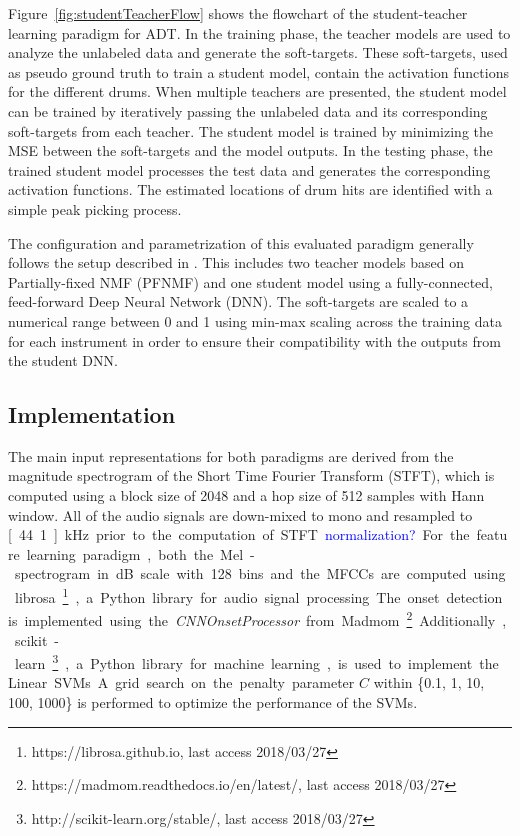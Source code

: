 \documentclass{article}
\newcommand{\comment}[1]{{\textcolor{blue}{#1}}}
\begin{document}
Figure~\ref{fig:studentTeacherFlow} shows the flowchart of the student-teacher learning paradigm for ADT. In the training phase, the teacher models are used to analyze the unlabeled data and generate the soft-targets. These soft-targets, used as pseudo ground truth to train a student model, contain the activation functions for the different drums. 
When multiple teachers are presented, the student model can be trained by iteratively passing the unlabeled data and its corresponding soft-targets from each teacher. The student model is trained by minimizing the MSE between the soft-targets and the model outputs. 
In the testing phase, the trained student model processes the test data and generates the corresponding activation functions. The estimated locations of drum hits are identified with a simple peak picking process. 

The configuration and parametrization of this evaluated paradigm generally follows the setup described in \cite{Wu2017}. This includes two teacher models based on Partially-fixed NMF (PFNMF) \cite{Wu2015_ismir} and one student model using a fully-connected, feed-forward Deep Neural Network (DNN). The soft-targets are scaled to a numerical range between 0 and 1 using min-max scaling across the training data for each instrument in order to ensure their compatibility with the outputs from the student DNN. 
\subsection{Implementation}
The main input representations for both paradigms are derived from the magnitude spectrogram of the Short Time Fourier Transform (STFT), which is computed using a block size of 2048 and a hop size of 512 samples with Hann window. All of the audio signals are down-mixed to mono and resampled to \unit[44.1]{kHz} prior to the computation of STFT. \comment{normalization?}

For the feature learning paradigm, both the Mel-spectrogram in dB scale with 128 bins and the MFCCs are computed using librosa\footnote{https://librosa.github.io, last access 2018/03/27}, a Python library for audio signal processing. The onset detection is implemented using the \textit{CNNOnsetProcessor} from Madmom\footnote{https://madmom.readthedocs.io/en/latest/, last access 2018/03/27}. Additionally, scikit-learn\footnote{http://scikit-learn.org/stable/, last access 2018/03/27}, a Python library for machine learning, is used to implement  the Linear SVMs. A grid search on the penalty parameter $C$ within \{0.1, 1, 10, 100, 1000\} is performed to optimize the performance of the SVMs. 
\end{document}
